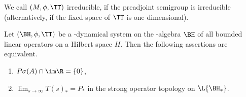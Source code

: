 We call $ (M,\phi,\TT) $  irreducible, if the preadjoint semigroup is irreducible (alternatively, if the fixed space of\/ $ \TT $  is one dimensional).
\begin{proposition}\label{prop:d4-3.7}
Let $ (\BH,\phi,\TT) $  be a \WA-dynamical system on the \WA-algebra $ \BH $  of all bounded linear operators on a Hilbert space $ H $.
Then the following assertions are equivalent.
\begin{enumerate}[\upshape (a)]
\item
$ P\sigma(A) \cap \im\R = \{0\} $,

\item
$ \lim_{s \to \infty} T(s)_{*} = P_{*} $  in the strong operator topology on $ \L{\BH_{*}} $.
\end{enumerate}
\end{proposition}
